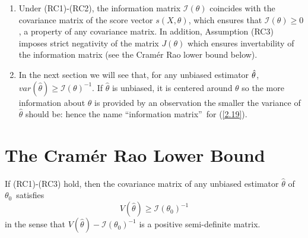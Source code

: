 \documentclass[notes=show]{beamer}
\begin{document}
\begin{frame}%



\begin{enumerate}
\item Under (RC1)-(RC2), the information matrix $\mathcal{I}\left( \theta
\right) $ coincides with the covariance matrix of the score vector $s\left(
X,\theta \right) $, which ensures that $\mathcal{I}\left( \theta \right)
\geq 0$, a property of any covariance matrix. In addition, Assumption (RC3)
imposes strict negativity of the matrix $J\left( \theta \right) $ which
ensures invertability of the information matrix (see the Cram\'{e}r Rao
lower bound below).

\item In the next section we will see that, for any unbiased estimator $\hat{%
\theta}$, $var\left( \hat{\theta}\right) \geq \mathcal{I}\left( \theta
\right) ^{-1}$. If $\hat{\theta}$ is unbiased, it is centered around $\theta 
$ so the more information about $\theta $ is provided by an observation the
smaller the variance of $\hat{\theta}$ should be: hence the name
\textquotedblleft information matrix\textquotedblright\ for (\ref{2.19}).
\end{enumerate}

\end{frame}%

\section{The Cram\'{e}r Rao Lower Bound}

\begin{frame}%


\begin{theorem}
If (RC1)-(RC3) hold, then the covariance matrix of any unbiased estimator $%
\hat{\theta}$ of $\theta _{0}$\ satisfies%
\begin{equation*}
V\left( \hat{\theta}\right) \geq \mathcal{I}\left( \theta _{0}\right) ^{-1}
\end{equation*}%
in the sense that $V\left( \hat{\theta}\right) -\mathcal{I}\left( \theta
_{0}\right) ^{-1}$ is a positive semi-definite matrix.
\end{theorem}

\end{frame}%
\end{document}
